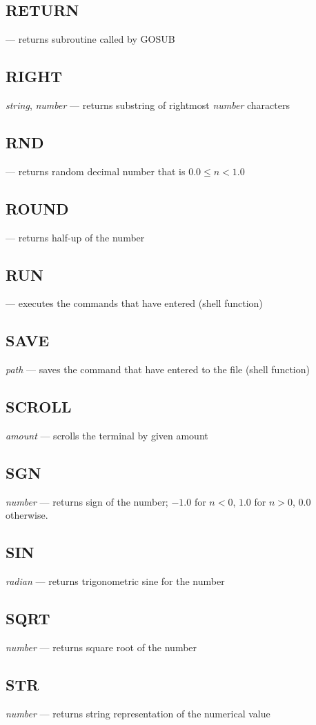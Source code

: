 \subsection{RETURN} --- returns subroutine called by GOSUB
\subsection{RIGHT} \emph{string}, \emph{number} --- returns substring of rightmost \emph{number} characters
\subsection{RND} --- returns random decimal number that is $ 0.0 \leq n < 1.0 $
\subsection{ROUND} --- returns half-up of the number
\subsection{RUN} --- executes the commands that have entered (shell function)
\subsection{SAVE} \emph{path} --- saves the command that have entered to the file (shell function)
\subsection{SCROLL} \emph{amount} --- scrolls the terminal by given amount
\subsection{SGN} \emph{number} --- returns sign of the number; $ -1.0 $ for $ n < 0 $, $ 1.0 $ for $ n > 0 $, $ 0.0 $ otherwise.
\subsection{SIN} \emph{radian} --- returns trigonometric sine for the number
\subsection{SQRT} \emph{number} --- returns square root of the number
\subsection{STR} \emph{number} --- returns string representation of the numerical value
